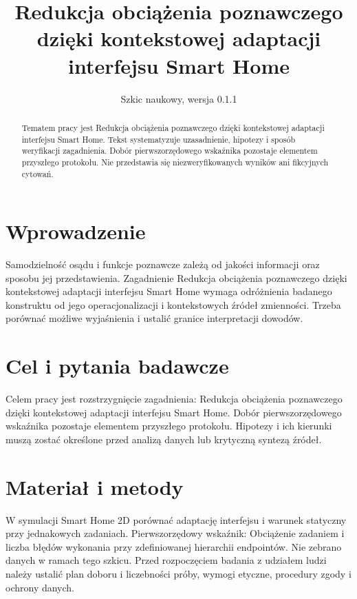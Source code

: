 \documentclass[11pt,a4paper]{article}
\title{Redukcja obciążenia poznawczego dzięki kontekstowej adaptacji interfejsu Smart Home}
\author{}
\date{Szkic naukowy, wersja 0.1.1}
\begin{document}
\maketitle

\begin{abstract}

Tematem pracy jest Redukcja obciążenia poznawczego dzięki kontekstowej adaptacji interfejsu Smart Home. Tekst systematyzuje uzasadnienie, hipotezy i sposób weryfikacji zagadnienia. Dobór pierwszorzędowego wskaźnika pozostaje elementem przyszłego protokołu. Nie przedstawia się niezweryfikowanych wyników ani fikcyjnych cytowań.

\end{abstract}

\section{Wprowadzenie}

Samodzielność osądu i funkcje poznawcze zależą od jakości informacji oraz sposobu jej przedstawienia. Zagadnienie Redukcja obciążenia poznawczego dzięki kontekstowej adaptacji interfejsu Smart Home wymaga odróżnienia badanego konstruktu od jego operacjonalizacji i kontekstowych źródeł zmienności. Trzeba porównać możliwe wyjaśnienia i ustalić granice interpretacji dowodów.

\section{Cel i pytania badawcze}

Celem pracy jest rozstrzygnięcie zagadnienia: Redukcja obciążenia poznawczego dzięki kontekstowej adaptacji interfejsu Smart Home. Dobór pierwszorzędowego wskaźnika pozostaje elementem przyszłego protokołu. Hipotezy i ich kierunki muszą zostać określone przed analizą danych lub krytyczną syntezą źródeł.

\section{Materiał i metody}

W symulacji Smart Home 2D porównać adaptację interfejsu i warunek statyczny przy jednakowych zadaniach. Pierwszorzędowy wskaźnik: Obciążenie zadaniem i liczba błędów wykonania przy zdefiniowanej hierarchii endpointów. Nie zebrano danych w ramach tego szkicu. Przed rozpoczęciem badania z udziałem ludzi należy ustalić plan doboru i liczebności próby, wymogi etyczne, procedury zgody i ochrony danych.
\end{document}
